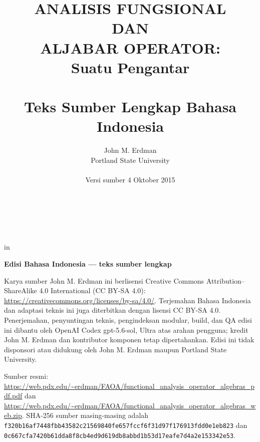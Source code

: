 \documentclass[11pt,reqno]{amsbook}
\theoremstyle{definition}
\theoremstyle{remark}
\numberwithin{equation}{section}
\begin{document}
 \frontmatter
 \title{ANALISIS FUNGSIONAL \\ DAN \\ ALJABAR OPERATOR: \\ Suatu Pengantar \\ \mbox{} \\ \large Teks Sumber Lengkap Bahasa Indonesia}
 \author{John M. Erdman \\
      Portland State University \\
      \mbox{\hphantom{P}} \\
      Versi sumber 4 Oktober 2015 \\
      \mbox{\hphantom{P}} \\
      \mbox{\hphantom{P}} \\
            \mbox{\hphantom{P}} \\
                  \mbox{\hphantom{P}} }


 in


\maketitle


\begin{center}
\textbf{Edisi Bahasa Indonesia --- teks sumber lengkap}
\end{center}

Karya sumber John M. Erdman ini berlisensi Creative Commons
Attribution--ShareAlike 4.0 International (CC BY-SA 4.0):
\url{https://creativecommons.org/licenses/by-sa/4.0/}.
Terjemahan Bahasa Indonesia dan adaptasi teknis ini juga diterbitkan dengan
lisensi CC BY-SA 4.0. Penerjemahan, penyuntingan teknis, pengindeksan modular,
build, dan QA edisi ini dibantu oleh OpenAI Codex gpt-5.6-sol, Ultra atas arahan
pengguna; kredit John M. Erdman dan kontributor komponen tetap dipertahankan.
Edisi ini tidak
disponsori atau didukung oleh John M. Erdman maupun Portland State University.

\begin{sloppypar}
Sumber resmi:
\url{https://web.pdx.edu/~erdman/FAOA/functional_analysis_operator_algebras_pdf.pdf}
dan
\url{https://web.pdx.edu/~erdman/FAOA/functional_analysis_operator_algebras_web.zip}.
SHA-256 sumber masing-masing adalah
\texttt{f320b16af7448fbb43582c21569840fe\allowbreak657fccf6f31d97f176913fdd0e1eb823}
dan
\texttt{0c667cfa7420b61dda8f8cb4ed9d619d\allowbreak b8abbd1b53d17eafe7d4a2e153342e53}.
\end{sloppypar}
\end{document}
